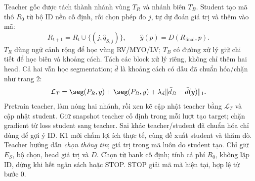  Teacher gốc được tách thành nhánh vùng $T_R$ và nhánh biên $T_B$. Student tạo mã thô $R_0$ từ bộ ID nền cố định, rồi chọn phép đo $j$, tự dự đoán giá trị và thêm vào mã:
\[
R_{t+1}=R_t\cup\{(j,\hat q_{S,j})\},\qquad
\hat y(p)=D(R_{\mathrm{final}},p).
\]
 $T_R$ dùng ngữ cảnh rộng để học vùng RV/MYO/LV; $T_B$ có đường xử lý giữ chi tiết để học biên và khoảng cách. Tách các block xử lý riêng, không chỉ thêm hai head. Cả hai vẫn học segmentation; $\bar d$ là khoảng cách có dấu đã chuẩn hóa/chặn như trang 2:
\[
\mathcal L_T=\seg(P_R,y)+\seg(P_B,y)
+\lambda_d\|\bar d_B-\bar d(y)\|_1.
\]
 Pretrain teacher, làm nóng hai nhánh, rồi xen kẽ cập nhật teacher bằng $\mathcal L_T$ và cập nhật student. Giữ snapshot teacher cố định trong mỗi lượt tạo target; chặn gradient từ loss student sang teacher.
 Sai khác teacher/student đã chuẩn hóa chỉ dùng để gợi ý ID. K1 mới chấm lợi ích thực tế, cùng đề xuất student và thăm dò. Teacher hướng dẫn \emph{chọn thông tin}; giá trị trong mã luôn do student tạo.
 Chỉ giữ $E_S$, bộ chọn, head giá trị và $D$. Chọn từ bank cố định; tính cả phí $R_0$, không lặp ID, dừng khi hết ngân sách hoặc STOP. STOP giải mã mã hiện tại, hợp lệ từ bước 0.
